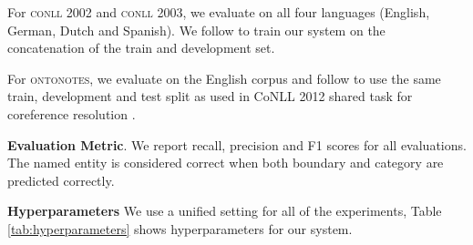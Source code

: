 \documentclass[11pt,a4paper]{article}
\newcommand{\ACRO}[1]{\textsc{#1}}
\newcommand{\CONLLTWO}{\ACRO{conll 2002}}
\newcommand{\CONLLTHREE}{\ACRO{conll 2003}}
\newcommand{\ONTONOTES}{\ACRO{ontonotes}}
\begin{document}
For {\CONLLTWO} and {\CONLLTHREE}, we evaluate on all four languages (English, German, Dutch and Spanish). We follow  to train our system on the concatenation of the train and development set. 

For {\ONTONOTES}, we evaluate on the English corpus and follow  to use the same train, development and test split as used in CoNLL 2012 shared task for coreference resolution \cite{pradhan2012conllst}.

\textbf{Evaluation Metric}. We report recall, precision and F1 scores for all evaluations. The named entity is considered correct when both boundary and category are predicted correctly.

\textbf{Hyperparameters} We use a unified setting for all of the experiments, Table \ref{tab:hyperparameters} shows hyperparameters for our system.
\end{document}
